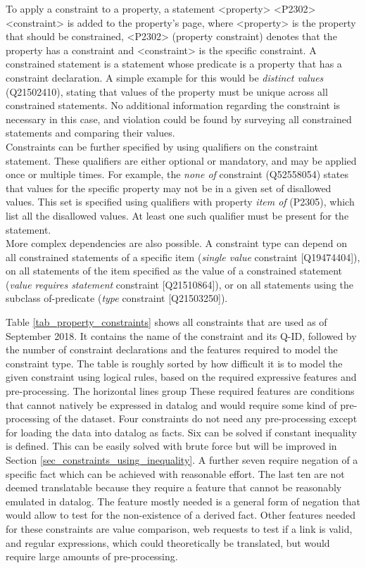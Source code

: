 \documentclass[hyperref,bachelorofscience,fleqn]{cgvpub}
\begin{document}
To apply a constraint to a property, a statement <property> <P2302> <constraint> is added to the property's page, where <property> is the property that should be constrained, <P2302> (property constraint) denotes that the property has a constraint and <constraint> is the specific constraint. A constrained statement is a statement whose predicate is a property that has a constraint declaration. A simple example for this would be \emph{distinct values} (Q21502410), stating that values of the property must be unique across all constrained statements. No additional information regarding the constraint is necessary in this case, and violation could be found by surveying all constrained statements and comparing their values.\\
Constraints can be further specified by using qualifiers on the constraint statement. These qualifiers are either optional or mandatory, and may be applied once or multiple times. For example, the \emph{none of} constraint (Q52558054) states that values for the specific property may not be in a given set of disallowed values. This set is specified using qualifiers with property \emph{item of} (P2305), which list all the disallowed values. At least one such qualifier must be present for the statement.\\
More complex dependencies are also possible. A constraint type can depend on all constrained statements of a specific item (\emph{single value} constraint [Q19474404]), on all statements of the item specified as the value of a constrained statement (\emph{value requires statement} constraint [Q21510864]), or on all statements using the subclass of-predicate (\emph{type} constraint [Q21503250]).

Table \ref{tab_property_constraints} shows all constraints that are used as of September 2018. It contains the name of the constraint and its Q-ID, followed by the number of constraint declarations and the features required to model the constraint type. The table is roughly sorted by how difficult it is to model the given constraint using logical rules, based on the required expressive features and pre-processing. The horizontal lines group  These required features are conditions that cannot natively be expressed in datalog and would require some kind of pre-processing of the dataset. Four constraints do not need any pre-processing except for loading the data into datalog as facts. Six can be solved if constant inequality is defined. This can be easily solved with brute force but will be improved in Section \ref{sec_constraints_using_inequality}. A further seven require negation of a specific fact which can be achieved with reasonable effort. The last ten are not deemed translatable because they require a feature that cannot be reasonably emulated in datalog. The feature mostly needed is a general form of negation that would allow to test for the non-existence of a derived fact. Other features needed for these constraints are value comparison, web requests to test if a link is valid, and regular expressions, which could theoretically be translated, but would require large amounts of pre-processing.
\end{document}
